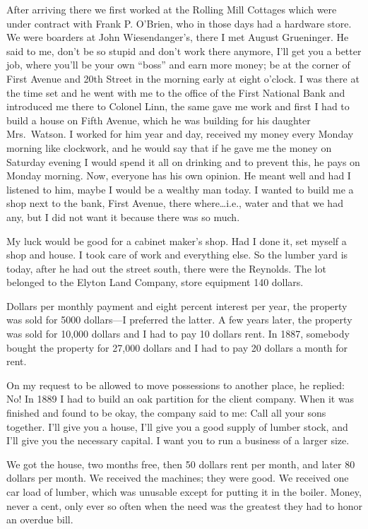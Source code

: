 After arriving there we first worked at the Rolling Mill Cottages which were under contract with Frank P. O'Brien, who in those days had a hardware store. We were boarders at John Wiesendanger's, there I met August Grueninger. He said to me, don't be so stupid and don't work there anymore, I'll get you a better job, where you'll be your own ``boss'' and earn more money; be at the corner of First Avenue and 20th Street in the morning early at eight o'clock. I was there at the time set and he went with me to the office of the First National Bank and introduced me there to Colonel Linn, the same gave me work and first I had to build a house on Fifth Avenue, which he was building for his daughter Mrs.~Watson. I worked for him year and day, received my money every Monday morning like clockwork, and he would say that if he gave me the money on Saturday evening I would spend it all on drinking and to prevent this, he pays on Monday morning. Now, everyone has his own opinion. He meant well and had I listened to him, maybe I would be a wealthy man today. I wanted to build me a shop next to the bank, First Avenue, there where\ldots i.e., water and that we had any, but I did not want it because there was so much.

My luck would be good for a cabinet maker's shop. Had I done it, set myself a shop and house. I took care of work and everything else. So the lumber yard is today, after he had out the street south, there were the Reynolds. The lot belonged to the Elyton Land Company, store equipment 140 dollars.

Dollars per monthly payment and eight percent interest per year, the property was sold for 5000 dollars---I preferred the latter. A few years later, the property was sold for 10,000 dollars and I had to pay 10 dollars rent. In 1887, somebody bought the property for 27,000 dollars and I had to pay 20 dollars a month for rent.

On my request to be allowed to move possessions to another place, he replied: No! In 1889 I had to build an oak partition for the client company. When it was finished and found to be okay, the company said to me: Call all your sons together. I'll give you a house, I'll give you a good supply of lumber stock, and I'll give you the necessary capital. I want you to run a business of a larger size.

We got the house, two months free, then 50 dollars rent per month, and later 80 dollars per month. We received the machines; they were good. We received one car load of lumber, which was unusable except for putting it in the boiler. Money, never a cent, only ever so often when the need was the greatest they had to honor an overdue bill.

